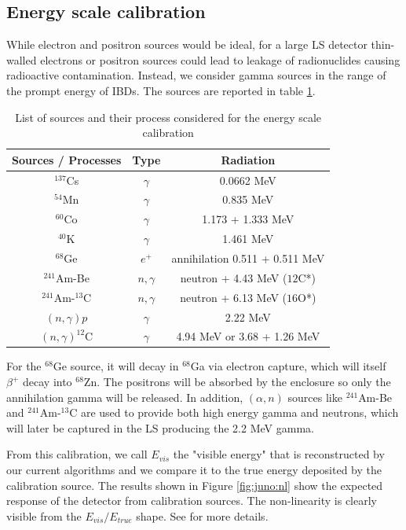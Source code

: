 \documentclass[../main.tex]{subfiles}
\begin{document}
\subsection{Energy scale calibration}

While electron and positron sources would be ideal, for a large LS detector thin-walled electrons or positron sources could lead to leakage of radionuclides causing radioactive contamination. Instead, we consider gamma sources in the range of the prompt energy of IBDs. The sources are reported in table \ref{tab:juno:calib_source}.

\begin{table}[ht]
  \centering
  \begin{tabular}{|c|c|c|}
    \hline
    Sources / Processes & Type & Radiation \\
    \hline
    $^{137}$Cs          & $\gamma$ & 0.0662 MeV \\
    $^{54}$Mn           & $\gamma$ & 0.835 MeV \\
    $^{60}$Co           & $\gamma$ & 1.173 + 1.333 MeV \\
    $^{40}$K            & $\gamma$ & 1.461 MeV \\
    $^{68}$Ge           & $e^{+}$  &  annihilation 0.511 + 0.511 MeV \\
    $^{241}$Am-Be       & $n,\gamma$ & neutron + 4.43 MeV (${12}$C*) \\
    $^{241}$Am-$^{13}$C & $n,\gamma$ & neutron + 6.13 MeV (${16}$O*) \\
    $(n, \gamma)p$      & $\gamma$ & 2.22 MeV \\
    $(n, \gamma)^{12}$C & $\gamma$ & 4.94 MeV or 3.68 + 1.26 MeV \\
    \hline
  \end{tabular}
  \caption{List of sources and their process considered for the energy scale calibration}
  \label{tab:juno:calib_source}
\end{table}

For the $^{68}$Ge source, it will decay in $^{68}$Ga via electron capture, which will itself $\beta^+$ decay into $^{68}$Zn. The positrons will be absorbed by the enclosure so only the annihilation gamma will be released. In addition, $(\alpha, n)$ sources like $^{241}$Am-Be and $^{241}$Am-$^{13}$C are used to provide both high energy gamma and neutrons, which will later be captured in the LS producing the 2.2 MeV gamma.

From this calibration, we call $E_{vis}$ the "visible energy" that is reconstructed by our current algorithms and we compare it to the true energy deposited by the calibration source. The results shown in Figure \ref{fig:juno:nl} show the expected response of the detector from calibration sources. The non-linearity is clearly visible from the $E_{vis} / E_{true}$ shape. See \cite{juno_collaboration_calibration_2021} for more details.
\end{document}
